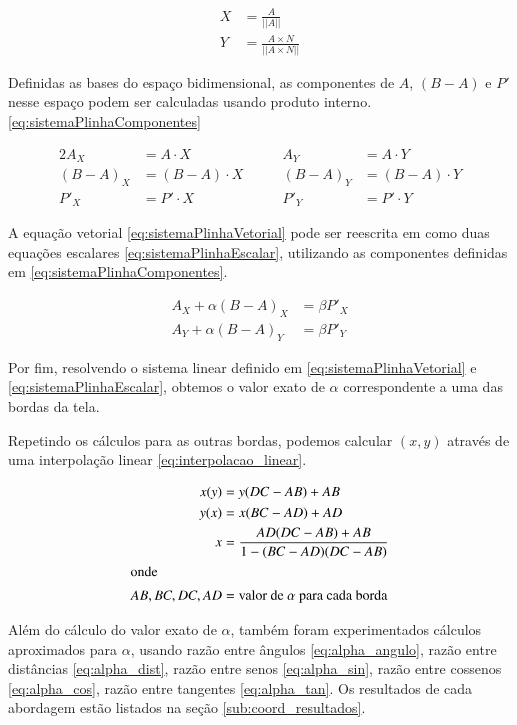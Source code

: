 \documentclass[brazil,pagestart=firstchapter]{abnt}
\begin{document}
\begin{align}
\label{eq:sistemaPlinhaBases}
X & = \frac{A}{ || A || }                     \\
Y & = \frac{A \times N}{ || A \times N || }   \nonumber
\end{align}

Definidas as bases do espaço bidimensional, as componentes de $A$, $(B-A)$ e
$P'$ nesse espaço podem ser calculadas usando produto interno.
\eqref{eq:sistemaPlinhaComponentes}

\begin{alignat}{2}
\label{eq:sistemaPlinhaComponentes}
A_X     & = A \cdot X     & \qquad A_Y     & = A \cdot Y      \\
(B-A)_X & = (B-A) \cdot X & \qquad (B-A)_Y & = (B-A) \cdot Y  \nonumber \\
P'_X    & = P' \cdot X    & \qquad P'_Y    & = P' \cdot Y     \nonumber
\end{alignat}

A equação vetorial \eqref{eq:sistemaPlinhaVetorial} pode ser reescrita em
como duas equações escalares \eqref{eq:sistemaPlinhaEscalar}, utilizando as
componentes definidas em \eqref{eq:sistemaPlinhaComponentes}.

\begin{align}
\label{eq:sistemaPlinhaEscalar}
A_X + \alpha (B-A)_X & = \beta P'_X  \\
A_Y + \alpha (B-A)_Y & = \beta P'_Y  \nonumber
\end{align}

Por fim, resolvendo o sistema linear definido em
\eqref{eq:sistemaPlinhaVetorial} e \eqref{eq:sistemaPlinhaEscalar}, obtemos
o valor exato de $\alpha$ correspondente a uma das bordas da tela.

Repetindo os cálculos para as outras bordas, podemos calcular $(x,y)$
através de uma interpolação linear \eqref{eq:interpolacao_linear}.

\begin{align}
\label{eq:interpolacao_linear}
x(y) & = y (DC - AB) + AB  \\
y(x) & = x (BC - AD) + AD  \nonumber \\
x    & = \frac{AD  (DC - AB) + AB}{1 - (BC - AD)  (DC - AB)}  \nonumber \\
\intertext{onde}
AB, BC, DC, AD & = \text{valor de $\alpha$ para cada borda} \nonumber
\end{align}

Além do cálculo do valor exato de $\alpha$, também foram experimentados
cálculos aproximados para $\alpha$, usando
razão entre ângulos \eqref{eq:alpha_angulo},
razão entre distâncias \eqref{eq:alpha_dist},
razão entre senos \eqref{eq:alpha_sin},
razão entre cossenos \eqref{eq:alpha_cos},
razão entre tangentes \eqref{eq:alpha_tan}.
Os resultados de cada abordagem estão listados na seção
\ref{sub:coord_resultados}.
\end{document}

